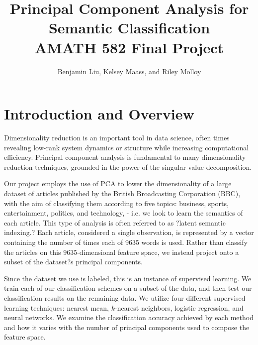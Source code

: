 \documentclass[12pt]{article}
\title{Principal Component Analysis for Semantic Classification \\ AMATH 582 Final Project}
\author{Benjamin Liu, Kelsey Maass, and Riley Molloy}
\begin{document}
\maketitle
\bigskip



\section{Introduction and Overview}
Dimensionality reduction is an important tool in data science, often times revealing low-rank system dynamics or structure while increasing computational efficiency. Principal component analysis is fundamental to many dimensionality reduction techniques, grounded in the power of the singular value decomposition. 

Our project employs the use of PCA to lower the dimensionality of a large dataset of articles published by the British Broadcasting Corporation (BBC), with the aim of classifying them according to five topics: business, sports, entertainment, politics, and technology, - i.e. we look to learn the semantics of each article. This type of analysis is often referred to as ?latent semantic indexing.? Each article, considered a single observation, is represented by a vector containing the number of times each of 9635 words is used. Rather than classify the articles on this 9635-dimensional feature space, we instead project onto a subset of the dataset?s principal components. 

Since the dataset we use is labeled, this is an instance of supervised learning. We train each of our classification schemes on a subset of the data, and then test our classification results on the remaining data. We utilize four different supervised learning techniques: nearest mean, $k$-nearest neighbors, logistic regression, and neural networks. We examine the classification accuracy achieved by each method and how it varies with the number of principal components used to compose the feature space.  
\end{document}
